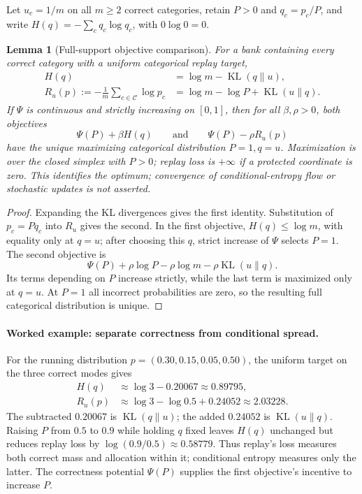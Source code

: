 \documentclass{article}
\newcommand{\1}{\mathbf 1}
\newtheorem{lemma}{Lemma}[section]
\theoremstyle{remark}
\theoremstyle{definition}
\theoremstyle{plain}
\begin{document}
Let $u_c=1/m$ on all $m\ge2$ correct categories, retain $P>0$ and
$q_c=p_c/P$, and write $H(q)=-\sum_cq_c\log q_c$, with $0\log0=0$.

\begin{lemma}[Full-support objective comparison]
\label{ext:lem-entropy-objectives}
For a bank containing every correct category with a uniform categorical
replay target,
\begin{align}
 H(q)&=\log m-\operatorname{KL}(q\|u),
 \label{ext:eq-conditional-entropy-kl}\\
 R_u(p):=-\frac1m\sum_{c\in\mathcal C}\log p_c
 &=\log m-\log P+\operatorname{KL}(u\|q).
 \label{ext:eq-uniform-replay-kl}
\end{align}
If $\Psi$ is continuous and strictly increasing on $[0,1]$, then for all
$\beta,\rho>0$, both objectives
\[
 \Psi(P)+\beta H(q)
 \qquad\text{and}\qquad
 \Psi(P)-\rho R_u(p)
\]
have the unique maximizing categorical distribution $P=1,q=u$. Maximization
is over the closed simplex with $P>0$; replay loss is $+\infty$ if a protected
coordinate is zero. This identifies the optimum; convergence of conditional-entropy
flow or stochastic updates is not asserted.
\end{lemma}

\begin{proof}
Expanding the KL divergences gives the first identity. Substitution of
$p_c=Pq_c$ into $R_u$ gives the second. In the first objective,
$H(q)\le\log m$, with equality only at $q=u$; after choosing this $q$,
strict increase of $\Psi$ selects $P=1$. The second objective is
\[
 \Psi(P)+\rho\log P-\rho\log m
       -\rho\operatorname{KL}(u\|q).
\]
Its terms depending on $P$ increase strictly, while the last term is
maximized only at $q=u$. At $P=1$ all incorrect probabilities are zero,
so the resulting full categorical distribution is unique.
\end{proof}

\paragraph{Worked example: separate correctness from conditional spread.}
For the running distribution $p=(0.30,0.15,0.05,0.50)$, the uniform target
on the three correct modes gives
\[
 \begin{aligned}
 H(q)&\approx\log3-0.20067\approx0.89795,\\
 R_u(p)&\approx\log3-\log0.5+0.24052\approx2.03228.
 \end{aligned}
\]
The subtracted $0.20067$ is $\operatorname{KL}(q\|u)$; the added $0.24052$
is $\operatorname{KL}(u\|q)$. Raising $P$ from $0.5$ to $0.9$ while holding
$q$ fixed leaves $H(q)$ unchanged but reduces replay loss by
$\log(0.9/0.5)\approx0.58779$. Thus replay's loss measures both correct mass
and allocation within it; conditional entropy measures only the latter.
The correctness potential $\Psi(P)$ supplies the first objective's incentive
to increase $P$.
\end{document}
